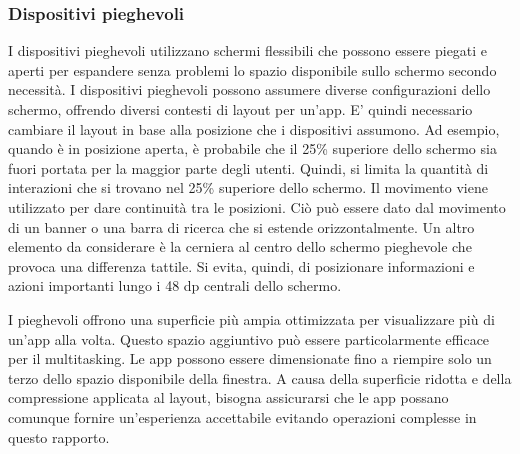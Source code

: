 \documentclass[12pt, a4paper]{report}
\begin{document}
		\subsubsection{Dispositivi pieghevoli}
		I dispositivi pieghevoli utilizzano schermi flessibili che possono essere piegati e aperti per espandere senza problemi lo spazio disponibile sullo schermo secondo necessità.  I dispositivi pieghevoli possono assumere diverse configurazioni dello schermo, offrendo diversi contesti di layout per un'app.
		E' quindi necessario cambiare il layout  in base alla posizione che i dispositivi assumono. Ad esempio, quando è in posizione aperta, è probabile che il 25\% superiore dello schermo sia fuori portata per la maggior parte degli utenti. Quindi, si limita la quantità di interazioni che si trovano nel 25\% superiore dello schermo.
		Il movimento viene utilizzato per dare continuità tra le posizioni. Ciò può essere dato dal movimento di un banner o una barra di ricerca che si estende orizzontalmente.
		Un altro elemento da considerare è la cerniera al centro dello schermo pieghevole che provoca una differenza tattile. Si evita, quindi,  di posizionare informazioni e azioni importanti lungo i 48 dp centrali dello schermo.

		I pieghevoli offrono una superficie più ampia ottimizzata per visualizzare più di un'app alla volta. Questo spazio aggiuntivo può essere particolarmente efficace per il multitasking. Le app possono essere dimensionate fino a riempire solo un terzo dello spazio disponibile della finestra. A causa della superficie ridotta e della compressione applicata al layout, bisogna assicurarsi che le app possano comunque fornire un'esperienza accettabile evitando operazioni complesse in questo rapporto.
\end{document}
